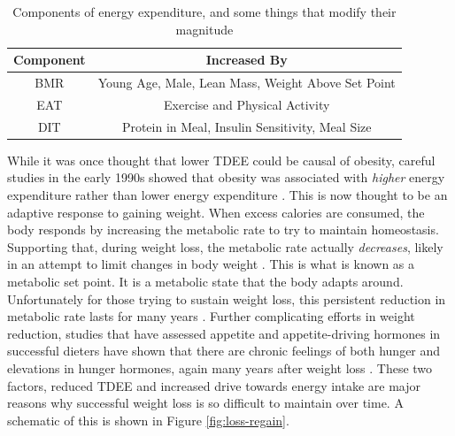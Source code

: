 \documentclass{tufte-handout}
\begin{document}
\begin{table}
\centering
\caption{Components of energy expenditure, and some things that modify their magnitude}
\label{tab:ee-components}
\begin{tabular}{cc}
\hline
\textbf{Component}       & \textbf{Increased By}                     \\
\hline
BMR & Young Age, Male, Lean Mass, Weight Above Set Point\\
EAT & Exercise and Physical Activity\\
DIT & Protein in Meal, Insulin Sensitivity, Meal Size\\
\hline
\end{tabular}
\end{table}


While it was once thought that lower TDEE could be causal of obesity, careful studies in the early 1990s showed that obesity was associated with \emph{higher} energy expenditure rather than lower energy expenditure \citep{Ravussin1982}.  This is now thought to be an adaptive response to gaining weight.  When excess calories are consumed, the body responds by increasing the metabolic rate to try to maintain homeostasis.  Supporting that, during weight loss, the metabolic rate actually \emph{decreases}, likely in an attempt to limit changes in body weight \citep{Leibel1995a}.  This is what is known as a metabolic set point.  It is a metabolic state that the body adapts around.  Unfortunately for those trying to sustain weight loss, this persistent reduction in metabolic rate lasts for many years \citep{Rosenbaum2008}.  Further complicating efforts in weight reduction, studies that have assessed appetite and appetite-driving hormones in successful dieters have shown that there are chronic feelings of both hunger and elevations in hunger hormones, again many years after weight loss \citep{Sumithran2011}.  These two factors, reduced TDEE and increased drive towards energy intake are major reasons why successful weight loss is so difficult to maintain over time.  A schematic of this is shown in Figure \ref{fig:loss-regain}.
\end{document}
